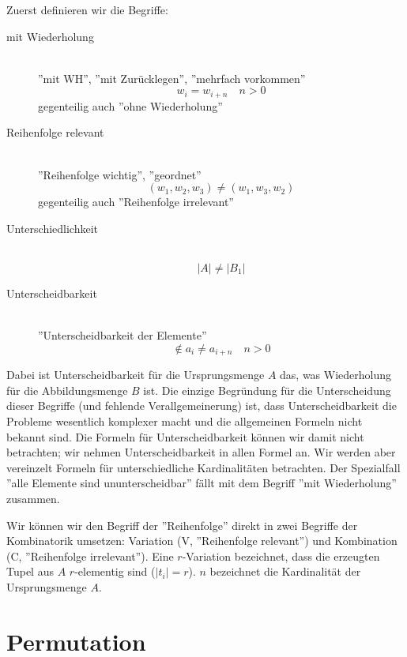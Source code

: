 \documentclass[a4paper,twocolumn]{article}
\begin{document}
Zuerst definieren wir die Begriffe:

\begin{description}
  \item[mit Wiederholung] \hfill{} \\
    ''mit WH'', ''mit Zurücklegen'', ''mehrfach vorkommen'' \\
    \[
        w_i = w_{i+n} \quad n > 0
    \]
    gegenteilig auch ''ohne Wiederholung'' \\
  \item[Reihenfolge relevant] \hfill{} \\
    ''Reihenfolge wichtig'', ''geordnet'' \\
    \[
        (w_1, w_2, w_3) \neq (w_1, w_3, w_2)
    \]
    gegenteilig auch ''Reihenfolge irrelevant''
  \item[Unterschiedlichkeit] \hfill{} \\
    \[
        |A| \neq |B_1|
    \]
  \item[Unterscheidbarkeit] \hfill{} \\
    ''Unterscheidbarkeit der Elemente'' \\
    \[
        \notin a_i \neq a_{i+n} \quad n > 0
    \]
\end{description}

Dabei ist Unterscheidbarkeit für die Ursprungsmenge $A$ das, was Wiederholung
für die Abbildungsmenge $B$ ist. Die einzige Begründung für die
Unterscheidung dieser Begriffe (und fehlende Verallgemeinerung) ist, dass
Unterscheidbarkeit die Probleme wesentlich komplexer macht und die
allgemeinen Formeln nicht bekannt sind. Die Formeln für Unterscheidbarkeit
können wir damit nicht betrachten; wir nehmen Unterscheidbarkeit in allen
Formel an. Wir werden aber vereinzelt Formeln für unterschiedliche Kardinalitäten
betrachten. Der Spezialfall ''alle Elemente sind ununterscheidbar'' fällt
mit dem Begriff ''mit Wiederholung'' zusammen.

Wir können wir den Begriff der ''Reihenfolge'' direkt in zwei
Begriffe der Kombinatorik umsetzen: Variation (V, ''Reihenfolge relevant'')
und Kombination (C, ''Reihenfolge irrelevant''). Eine $r$-Variation
bezeichnet, dass die erzeugten Tupel aus $A$ $r$-elementig sind
($|t_i| = r$). $n$ bezeichnet die Kardinalität der Ursprungsmenge $A$.

\section{Permutation}
\end{document}
